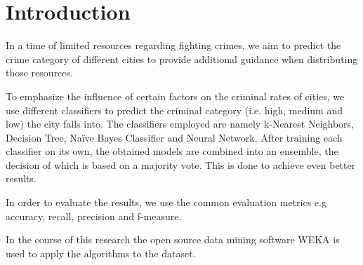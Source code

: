 \section{Introduction}

In a time of limited resources regarding fighting crimes, we aim to predict the crime category of different
cities to provide additional guidance when distributing those resources.

To emphasize the influence of certain factors on the criminal rates of cities, we use different
classifiers to predict the criminal category (i.e. high, medium and low) the city falls into. The classifiers
employed are namely k-Nearest Neighbors, Decision Tree, Na\"ive Bayes Classifier and Neural Network.
After training each classifier on its own, the obtained models are combined into an ensemble, the decision of
which is based on a majority vote. This is done to achieve even better results.

In order to evaluate the results, we use the common evaluation metrics e.g accuracy, recall, precision and
f-measure.

In the course of this research the open source data mining software WEKA is used to apply the algorithms to
the dataset.
